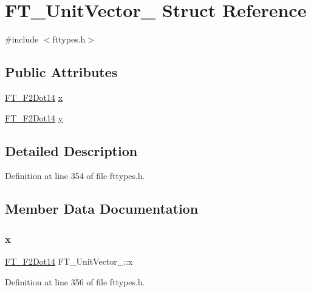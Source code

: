 \hypertarget{struct_f_t___unit_vector__}{}\section{F\+T\+\_\+\+Unit\+Vector\+\_\+ Struct Reference}
\label{struct_f_t___unit_vector__}


{\ttfamily \#include $<$fttypes.\+h$>$}

\subsection*{Public Attributes}
\begin{DoxyCompactItemize}
\item 
\mbox{\hyperlink{fttypes_8h_a430d070e946e531a607ae350e822ffca}{F\+T\+\_\+\+F2\+Dot14}} \mbox{\hyperlink{struct_f_t___unit_vector___a03c9f8ae35a5ad1bcac49995a9dac714}{x}}
\item 
\mbox{\hyperlink{fttypes_8h_a430d070e946e531a607ae350e822ffca}{F\+T\+\_\+\+F2\+Dot14}} \mbox{\hyperlink{struct_f_t___unit_vector___a12eb9ad5c47614f5f2d3f9e401933d0e}{y}}
\end{DoxyCompactItemize}


\subsection{Detailed Description}


Definition at line 354 of file fttypes.\+h.



\subsection{Member Data Documentation}
\mbox{\label{struct_f_t___unit_vector___a03c9f8ae35a5ad1bcac49995a9dac714}} 
\subsubsection{\texorpdfstring{x}{x}}
{\footnotesize\ttfamily \mbox{\hyperlink{fttypes_8h_a430d070e946e531a607ae350e822ffca}{F\+T\+\_\+\+F2\+Dot14}} F\+T\+\_\+\+Unit\+Vector\+\_\+\+::x}



Definition at line 356 of file fttypes.\+h.

\mbox{\label{struct_f_t___unit_vector___a12eb9ad5c47614f5f2d3f9e401933d0e}} 
